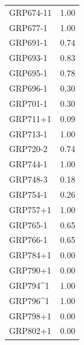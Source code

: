 \begin{longtable}{|l|r|}
GRP674-11 & 1.00 \\
GRP677-1 & 1.00 \\
GRP691-1 & 0.74 \\
GRP693-1 & 0.83 \\
GRP695-1 & 0.78 \\
GRP696-1 & 0.30 \\
GRP701-1 & 0.30 \\
GRP711+1 & 0.09 \\
GRP713-1 & 1.00 \\
GRP720-2 & 0.74 \\
GRP744-1 & 1.00 \\
GRP748-3 & 0.18 \\
GRP754-1 & 0.26 \\
GRP757+1 & 1.00 \\
GRP765-1 & 0.65 \\
GRP766-1 & 0.65 \\
GRP784+1 & 0.00 \\
GRP790+1 & 0.00 \\
GRP794\textasciicircum{}1 & 1.00 \\
GRP796\textasciicircum{}1 & 1.00 \\
GRP798+1 & 0.00 \\
GRP802+1 & 0.00 \\
\end{longtable}
